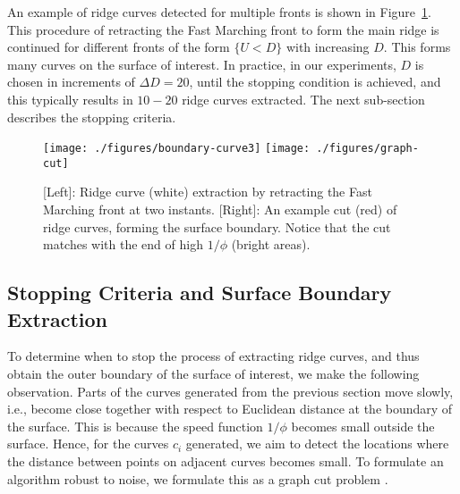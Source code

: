 \documentclass[10pt,journal,compsoc]{IEEEtran}
\newcommand{\comment}[1]{ }
\begin{document}
\comment{
\begin{algorithm}
  \begin{algorithmic}[1]
    \State Input: 2D cubical complex $C_F$ of FM front and
    Euclidean distance $U_E$ 
    \State Sort $C_F$ 1-faces from min to max based on $U_E$
    \Repeat 
    \State Let $g$ be the minimum value 1-face in $C_F$
    \If {$(f,g)$ or $(g,f)$ is a free pair in $C_F$ for some $f$}
    \State Remove $f$ and $g$ from $C_F$
    \EndIf
    \Until{no free pairs in $C_F$}
  \end{algorithmic}
  \caption{Ridge Curve Extraction}
  \label{alg:curve_extraction}
\end{algorithm}
}



An example of ridge curves detected for multiple fronts is shown in
Figure~\ref{fig:curve_extraction}. This procedure of retracting the
Fast Marching front to form the main ridge is continued for different
fronts of the form $\{ U < D \}$ with increasing $D$. This forms many
curves on the surface of interest.  In practice, in our experiments,
$D$ is chosen in increments of $\Delta D = 20$, until the stopping
condition is achieved, and this typically results in $10-20$ ridge
curves extracted. The next sub-section describes the stopping
criteria.

\def\fHeightCut{1.0in}
\begin{figure}
  \centering
  \texttt{[image: ./figures/boundary-curve3]}
  \texttt{[image: ./figures/graph-cut]}
  \caption{[Left]: Ridge curve (white) extraction by retracting the Fast
    Marching front at two instants. [Right]: An example cut (red) of
    ridge curves, forming the surface boundary. Notice that the cut
    matches with the end of high $1/\phi$ (bright areas).}
  \label{fig:curve_extraction}
\end{figure}


\subsection{Stopping Criteria and Surface Boundary Extraction}

\label{subsec:cut}

To determine when to stop the process of extracting ridge curves, and
thus obtain the outer boundary of the surface of interest, we make the
following observation. Parts of the curves generated from the previous
section move slowly, i.e., become close together with respect to
Euclidean distance at the boundary of the surface. This is because the
speed function $1/\phi$ becomes small outside the surface. Hence, for
the curves $c_i$ generated, we aim to detect the locations where the
distance between points on adjacent curves becomes small. To formulate
an algorithm robust to noise, we formulate this as a graph cut problem
\cite{boykov2001interactive}.
\end{document}
